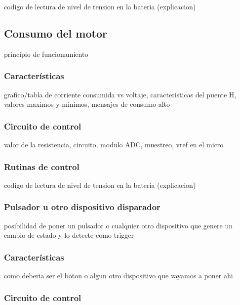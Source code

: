 codigo de lectura de nivel de tension en la bateria (explicacion)

\subsection{Consumo del motor}
\label{h_sensado_consumo}

principio de funcionamiento

\subsubsection{Caracter\'isticas}
\label{h_sensado_consumo_caracteristicas}

grafico/tabla de corriente consumida vs voltaje, caracteristicas del puente H, valores maximos y minimos, mensajes de consumo alto

\subsubsection{Circuito de control}
\label{h_sensado_consumo_circuito}

valor de la resistencia, circuito, modulo ADC, muestreo, vref en el micro

\subsubsection{Rutinas de control}
\label{h_sensado_consumo_rutinas}

codigo de lectura de nivel de tension en la bateria (explicacion)

\subsubsection{Pulsador u otro dispositivo disparador}
\label{h_sensado_pulsador}

posibilidad de poner un pulsador o cualquier otro dispositivo que genere un cambio de estado y lo detecte como trigger

\subsubsection{Caracter\'isticas}
\label{h_sensado_pulsador_caracteristicas}

como deberia ser el boton o algun otro dispositivo que vayamos a poner ahi

\subsubsection{Circuito de control}
\label{h_sensado_pulsador_circuito}

